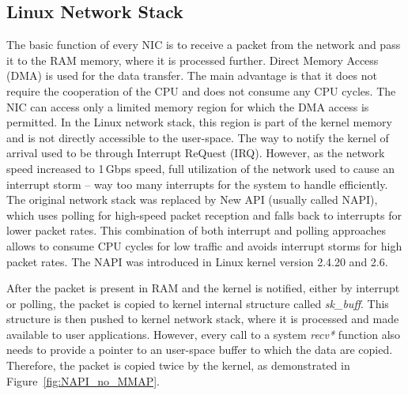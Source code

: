 \subsection{Linux Network Stack}

The basic function of every NIC is to receive a packet from the network and pass it to the RAM memory, where it is processed further. Direct Memory Access (DMA) is used for the data transfer. The main advantage is that it does not require the cooperation of the CPU and does not consume any CPU cycles. The NIC can access only a limited memory region for which the DMA access is permitted. In the Linux network stack, this region is part of the kernel memory and is not directly accessible to the user-space. The way to notify the kernel of arrival used to be through Interrupt ReQuest (IRQ). However, as the network speed increased to 1\,Gbps speed, full utilization of the network used to cause an interrupt storm -- way too many interrupts for the system to handle efficiently. The original network stack was replaced by New API (usually called NAPI), which uses polling for high-speed packet reception and falls back to interrupts for lower packet rates. This combination of both interrupt and polling approaches allows to consume CPU cycles for low traffic and avoids interrupt storms for high packet rates. The NAPI was introduced in Linux kernel version 2.4.20 and 2.6.

After the packet is present in RAM and the kernel is notified, either by interrupt or polling, the packet is copied to kernel internal structure called \emph{sk\_buff}. This structure is then pushed to kernel network stack, where it is processed and made available to user applications. However, every call to a system \emph{recv*} function also needs to provide a pointer to an user-space buffer to which the data are copied. Therefore, the packet is copied twice by the kernel, as demonstrated in Figure~\ref{fig:NAPI_no_MMAP}.

